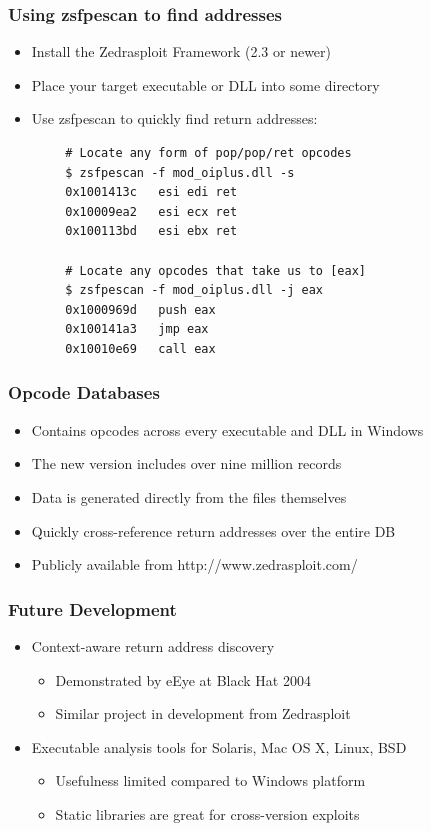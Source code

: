 \documentclass{beamer}
\newenvironment{sitemize}{\vspace{1mm}\begin{itemize}\itemsep 4pt\small}{\end{itemize}}
\begin{document}
\begin{frame}[fragile]
	\frametitle{Using zsfpescan to find addresses}
	\begin{sitemize}
		\item Install the Zedrasploit Framework (2.3 or newer)
		\item Place your target executable or DLL into some directory
		\item Use zsfpescan to quickly find return addresses:
	\end{sitemize}

{\footnotesize 
\begin{verbatim}
		# Locate any form of pop/pop/ret opcodes
		$ zsfpescan -f mod_oiplus.dll -s
		0x1001413c   esi edi ret
		0x10009ea2   esi ecx ret	
		0x100113bd   esi ebx ret

		# Locate any opcodes that take us to [eax]
		$ zsfpescan -f mod_oiplus.dll -j eax
		0x1000969d   push eax
		0x100141a3   jmp eax
		0x10010e69   call eax
\end{verbatim} 
}
\end{frame}

\begin{frame}[t]
	\frametitle{Opcode Databases}
	\begin{sitemize}
		\item Contains opcodes across every executable and DLL in Windows
		\item The new version includes over nine million records
		\item Data is generated directly from the files themselves
		\item Quickly cross-reference return addresses over the entire DB
		\item Publicly available from http://www.zedrasploit.com/
	\end{sitemize}	
\end{frame}

\begin{frame}[t]
	\frametitle{Future Development}
	\begin{sitemize}
		\item Context-aware return address discovery
		\begin{sitemize}
			\item Demonstrated by eEye at Black Hat 2004
			\item Similar project in development from Zedrasploit
		\end{sitemize}
	\end{sitemize}
	\pause
	
	\begin{sitemize}
		\item Executable analysis tools for Solaris, Mac OS X, Linux, BSD
		\begin{sitemize}
			\item Usefulness limited compared to Windows platform
			\item Static libraries are great for cross-version exploits
		\end{sitemize}
	\end{sitemize}	
\end{frame}
\end{document}
